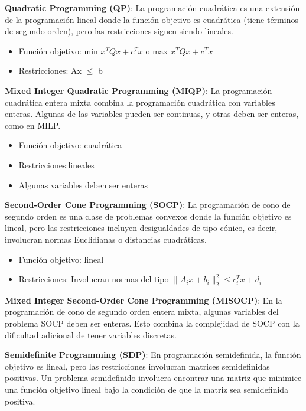 \textbf{Quadratic Programming (QP)}: La programación cuadrática es una extensión de la programación lineal donde la función objetivo es cuadrática (tiene términos de segundo orden), pero las restricciones siguen siendo lineales.

\begin{itemize}
	\item Función objetivo: min $x^TQx + c^Tx$ o max $x^TQx + c^Tx$
	\item Restricciones: Ax $\leq$ b
\end{itemize}


\textbf{Mixed Integer Quadratic Programming (MIQP)}: La programación cuadrática entera mixta combina la programación cuadrática con variables enteras. Algunas de las variables pueden ser continuas, y otras deben ser enteras, como en MILP.

\begin{itemize}
	\item Función objetivo: cuadrática
	\item Restricciones:lineales
	\item Algunas variables deben ser enteras	
\end{itemize}

\textbf{Second-Order Cone Programming (SOCP)}: La programación de cono de segundo orden es una clase de problemas convexos donde la función objetivo es lineal, pero las restricciones incluyen desigualdades de tipo cónico, es decir, involucran normas Euclidianas o distancias cuadráticas.

\begin{itemize}
	\item Función objetivo: lineal
	\item Restricciones: Involucran normas del tipo $\| A_i x + b_i \|_2^2 \leq c_i^T x + d_i$	
\end{itemize}

\textbf{Mixed Integer Second-Order Cone Programming (MISOCP)}: En la programación de cono de segundo orden entera mixta, algunas variables del problema SOCP deben ser enteras. Esto combina la complejidad de SOCP con la dificultad adicional de tener variables discretas.

\textbf{Semidefinite Programming (SDP)}: En programación semidefinida, la función objetivo es lineal, pero las restricciones involucran matrices semidefinidas positivas. Un problema semidefinido involucra encontrar una matriz que minimice una función objetivo lineal bajo la condición de que la matriz sea semidefinida positiva.

